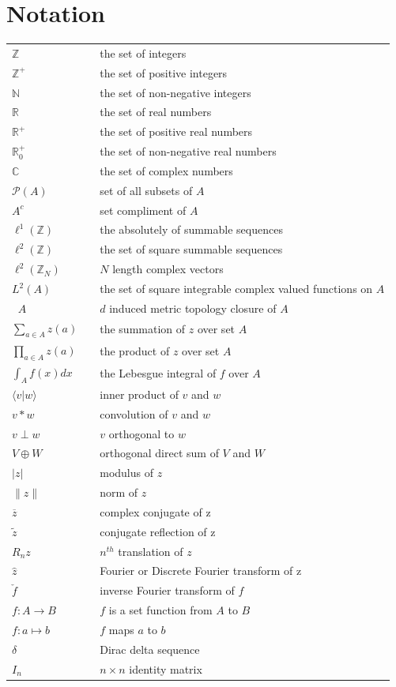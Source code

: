 \documentclass{report}
\newcommand{\N}{\mathbb{N}}
\newcommand{\Z}{\mathbb{Z}}
\newcommand{\R}{\mathbb{R}}
\newcommand{\C}{\mathbb{C}}
\newcommand{\pow}{\mathcal{P}}
\DeclareMathOperator{\closure}{\ensuremath{clos_d}}
\begin{document}
\section*{Notation}
\begin{small}
\begin{table}[!hf] \small
\begin{tabular}{ l c l}
$\Z$ && the set of integers\\
$\Z^+$ &&  the set of positive integers\\
 $\N$ &&  the set of non-negative integers\\
$\R$ &&  the set of real numbers\\
 $\R^+$ &&  the set of positive real numbers\\
  $\R^+_0$ &&  the set of non-negative real numbers\\
$\C$ &&  the set of complex numbers\\
$\pow (A)$&& set of all subsets of $A$\\ 
$A^c$&& set compliment of $A$\\ 
$\ell^1 (\Z)$ &&  the absolutely of summable sequences\\
$\ell^2 (\Z)$ &&  the set of square summable sequences\\
$\ell^2 (\Z_N)$ &&  $N$ length complex vectors\\
$L^2 (A )$ &&  the set of square integrable complex valued functions on $A$\\
$\closure A$ && $d$ induced metric topology closure of $A$\\
$\sum_{a\in A} z(a) $ &&  the summation of $z$ over set $A$\\
$\prod_{a\in A} z(a) $ &&  the product of $z$ over set $A$\\
$\int_A f(x) dx$ &&  the Lebesgue integral of $f$ over $A$\\
$\langle v|w \rangle$ &&  inner product of $v$ and $w$\\
 $ v\ast w$  && convolution of $v$ and $w$\\
$v \perp w$&& $v$ orthogonal to $w$\\
$V \oplus W$&& orthogonal direct sum of $V$ and $W$\\
$|z|$&& modulus of $z$ \\
$\|z\|$&& norm of $z$ \\
$\overline z$&& complex conjugate of z\\
$\tilde z$&& conjugate reflection of z\\
 $R_nz$ && $n^{th}$ translation of $z$\\
$\hat z$&&Fourier or Discrete Fourier transform of z\\
 $\check f$ && inverse Fourier transform of $f$\\
$f:A \to B$&& $f$ is a set function from $A$ to $B$\\
$f:a \mapsto b$&& $f$ maps $a$ to $b$\\
$\delta$ && Dirac delta sequence \\
$I_n$&& $n \times n$ identity matrix\\
\end{tabular}
\end{table}
\end{small}
\end{document}
